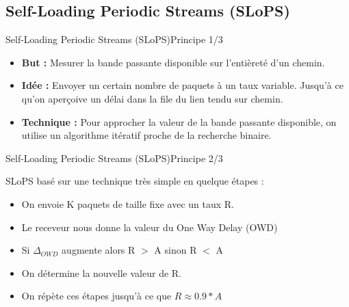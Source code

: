 \documentclass[compress]{beamer}
\begin{document}
\subsection{Self-Loading Periodic Streams (SLoPS)}
\begin{frame}{Self-Loading Periodic Streams (SLoPS)}{Principe 1/3}
\begin{itemize}
\item \textbf{But :}  Mesurer la {\color{red}bande passante disponible} sur l'entièreté d'un chemin.
\pause
\item \textbf{Idée :}  Envoyer un certain nombre de paquets à un taux variable. Jusqu'à ce qu'on aperçoive un délai dans la file du lien tendu sur chemin.
\pause
\item \textbf{Technique :} Pour approcher la valeur de la bande passante
disponible, on utilise un algorithme itératif proche de la recherche binaire.
\end{itemize}
\end{frame}
\begin{frame}{Self-Loading Periodic Streams (SLoPS)}{Principe 2/3}

SLoPS basé sur une technique très simple en quelque étapes :
\begin{itemize}
\item On envoie K paquets de taille fixe avec un taux R.
\pause
\item Le receveur nous donne la valeur du One Way Delay (OWD)
\item Si $\Delta_{OWD}$ augmente alors R $>$ A sinon R $<$ A
\pause
\item On détermine la nouvelle valeur de R.
\item On répète ces étapes jusqu'à ce que $R \approx 0.9 * A$
\end{itemize}
\end{frame}
\end{document}
